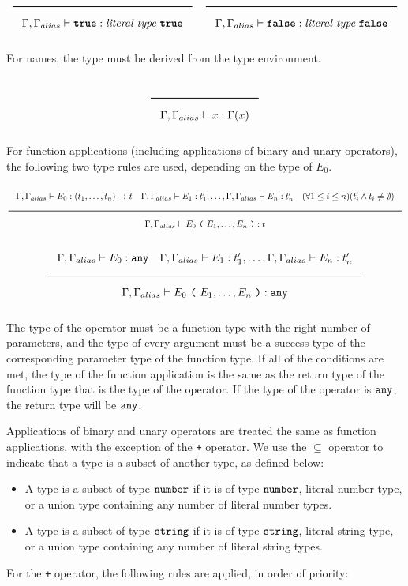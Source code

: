 \noindent
\[
  \Rule{}{\Gamma, \Gamma_{alias} \vdash \TruE : \textit{literal type}\ \TruE}
  \quad
  \Rule{}{\Gamma, \Gamma_{alias} \vdash \FalsE : \textit{literal type}\ \FalsE}
\]
\noindent

For names, the type must be derived from the type environment.

\noindent
\[
  \Rule{}{\Gamma, \Gamma_{alias} \vdash x : \Gamma(x)}
\]
\noindent

For function applications (including applications of binary and unary operators), the following two type rules are used, depending on the type of $E_0$.

\noindent
\[
\Rule{\Gamma, \Gamma_{alias} \vdash E_0 : (t_1, \ldots, t_n) \rightarrow t \quad \Gamma, \Gamma_{alias} \vdash E_1 : t'_1, \ldots,  \Gamma, \Gamma_{alias} \vdash E_n : t'_n
  \quad (\forall 1 \leq i \leq n)(t'_i \wedge t_i \neq \emptyset)}{\Gamma, \Gamma_{alias} \vdash E_0\ \Lp \ E_1, \ldots, E_n\ \Rp : t}
\]
\noindent
\[
  \Rule{\Gamma, \Gamma_{alias} \vdash E_0 : \Any \quad \Gamma, \Gamma_{alias} \vdash E_1 : t'_1, \ldots, \Gamma, \Gamma_{alias} \vdash E_n : t'_n
    }{\Gamma, \Gamma_{alias} \vdash E_0\ \Lp \ E_1, \ldots, E_n\ \Rp : \Any}
\]
\noindent

The type of the operator must be a function type with the right number of parameters,
and the type of every argument must be a success type of the corresponding parameter type of the function type.
If all of the conditions are met, the type of the function application is the same
as the return type of the function type that is the type of the operator.
If the type of the operator is $\texttt{any}$, the return type will be $\texttt{any}$.

Applications of binary and unary operators are treated the same as function applications, with the exception of the \texttt{+} operator.
We use the $\subseteq$ operator to indicate that a type is a subset of another type, as defined below:

\begin{itemize}
\item{A type is a subset of type $\texttt{number}$ if it is of type $\texttt{number}$, literal number type,
  or a union type containing any number of literal number types.}
\item{A type is a subset of type $\texttt{string}$ if it is of type $\texttt{string}$, literal string type,
  or a union type containing any number of literal string types.}
\end{itemize}

For the \texttt{+} operator, the following rules are applied, in order of priority:

